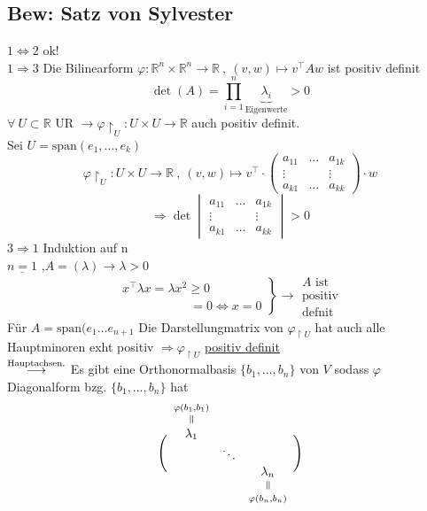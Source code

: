 \documentclass[titlepage,12pt,a4paper,ngerman]{report}
\newcommand{\verteq}{\rotatebox{90}{$\,=$}}
\newcommand{\equalto}[2]{\underset{\scriptstyle\overset{\mkern4mu\verteq}{#2}}{#1}}
\newcommand{\equaltoup}[2]{\overset{\scriptstyle\underset{\mkern4mu\verteq}{#2}}{#1}}
\newcommand{\tx}[1]{\textrm{#1}}
\newcommand{\ub}[1]{\underbrace{#1}}
\newcommand{\spa}{\tx{span}}
\newcommand{\basis}[3]{\{#1_{#2}, \dots, #1_{#3}\}}
\begin{document}
\subsection{Bew: Satz von Sylvester}
$ \boxed{1 \Leftrightarrow 2} $ ok!\\
$ \boxed{1 \Rightarrow 3} $ Die Bilinearform $ \varphi: \mathbb{R}^n \times \mathbb{R}^n \to \mathbb{R}\ ,\ (v,w) \mapsto v^\top A w $ ist positiv definit
$$\det(A) = \prod_{i=1}^{n} \ub{\lambda_i}_{\tx{Eigenwerte}} > 0$$
$\forall\ U \subset \mathbb{R}$ UR $ \rightarrow \varphi \upharpoonright_U : U \times U \to \mathbb{R} $ auch positiv definit.\\[5pt]
Sei $ U = \spa(e_1, \dots , e_k) $
$$\varphi\upharpoonright_U: U \times U \to \mathbb{R} \ , \ (v,w)  \mapsto v^\top \cdot \begin{pmatrix}
a_{11} & \dots & a_{1k}\\
\vdots & & \vdots \\
a _{k1} & \dots & a_{kk}
\end{pmatrix} \cdot w$$
$$\Rightarrow \det\begin{vmatrix}
a_{11} & \dots & a_{1k}\\
\vdots & & \vdots \\
a _{k1} & \dots & a_{kk}
\end{vmatrix} > 0 $$
$ \boxed{3 \Rightarrow 1} $ Induktion auf n\\
$\underline{n=1}$ ,$ A = (\lambda) \to \lambda > 0 $
$$\left.\begin{array}{cc}
x^\top \lambda x = \lambda x^2 \ge 0 \phantom{\Leftrightarrow x = 0}\\
\phantom{x^\top \lambda x  = \lambda x^2 \  } = 0 \Leftrightarrow x = 0
\end{array} \right\} \rightarrow \substack{A \tx{ ist }\\\tx{positiv} \\\tx{defnit}}$$
Für $A = \spa (e_1 \dots e_{n+1}$ Die Darstellungmatrix von $\varphi_{\upharpoonright U}$ hat auch alle Hauptminoren exht positiv $\Rightarrow \varphi_{\upharpoonright U}$ \underline{positiv definit}\\
$\buildrel{\tx{Hauptachsen.}} \over \longrightarrow$ Es gibt eine Orthonormalbasis $\basis{b}{1}{n}$ von $V$ sodass $\varphi$ Diagonalform bzg. $\basis{b}{1}{n}$ hat 
$$\Bigg(
\begin{array}{ccc}
\equaltoup{\lambda_1}{\varphi(b_1,b_1)} \\
& \ddots \\
& & \equalto{\lambda_n}{\varphi(b_n,b_n)}
\end{array} \Bigg)$$
\end{document}

